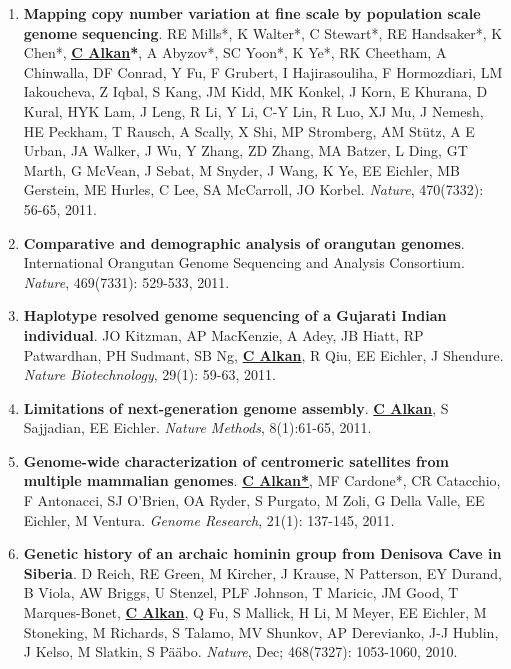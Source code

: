 \begin{enumerate}
\item
{\bf Mapping copy number variation at fine scale by population scale genome sequencing}.
RE Mills*, K Walter*, C Stewart*, RE Handsaker*, K Chen*, 
{\bf {\underline {C Alkan}*}}, A Abyzov*, SC Yoon*, K Ye*, RK Cheetham, 
A Chinwalla, DF Conrad, Y Fu, F Grubert, I Hajirasouliha, 
F Hormozdiari, LM Iakoucheva, Z Iqbal, S Kang, JM Kidd, 
MK Konkel, J Korn, E Khurana, D Kural, HYK Lam, J Leng, 
R Li, Y Li, C-Y Lin, R Luo, XJ Mu, J Nemesh,
HE Peckham, T Rausch, A Scally, X Shi, MP Stromberg, 
AM St\"{u}tz, A E Urban, JA Walker, J Wu, Y Zhang, 
ZD Zhang, MA Batzer, L Ding, GT Marth, G McVean, 
J Sebat, M Snyder, J Wang, K Ye, EE Eichler, 
MB Gerstein, ME Hurles, C Lee, SA McCarroll,  JO Korbel.
{\em Nature}, 470(7332): 56-65, 2011.

\clearpage
\item
{\bf Comparative and demographic analysis of orangutan genomes}. 
International Orangutan Genome Sequencing and Analysis Consortium.
{\em Nature}, 469(7331): 529-533, 2011.

\item
{\bf Haplotype resolved genome sequencing of a Gujarati Indian individual}.
JO Kitzman, AP MacKenzie, A Adey, JB Hiatt, RP Patwardhan, 
PH Sudmant, SB Ng, {\bf {\underline{C Alkan}}}, R Qiu, EE
Eichler, J Shendure.
{\em Nature Biotechnology}, 29(1): 59-63, 2011.

\item
{\bf Limitations of next-generation genome assembly}.
{\bf {\underline {C Alkan}}}, S Sajjadian, EE Eichler.
{\em Nature Methods}, 8(1):61-65, 2011. \\



\item
{\bf Genome-wide characterization of centromeric satellites from multiple mammalian genomes}.
{\bf {\underline {C Alkan*}}}, MF Cardone*, CR Catacchio, F Antonacci,
 SJ O'Brien, OA Ryder, S Purgato, M Zoli, G Della Valle, EE Eichler, M Ventura.
{\em Genome Research}, 21(1): 137-145, 2011.


\item
{\bf Genetic history of an archaic hominin group from Denisova Cave in Siberia}.
D Reich, RE Green, M Kircher, J Krause, 
N Patterson, EY Durand, B Viola, AW Briggs, 
U Stenzel, PLF Johnson, T Maricic, JM Good, 
T Marques-Bonet, {\bf {\underline {C Alkan}}}, Q Fu, S Mallick, H Li, 
M Meyer, EE Eichler, M Stoneking, M Richards, 
S Talamo, MV Shunkov, AP Derevianko, J-J Hublin, 
J Kelso, M Slatkin, S P\"{a}\"{a}bo.
{\em Nature}, Dec;  468(7327): 1053-1060, 2010.


\end{enumerate}
